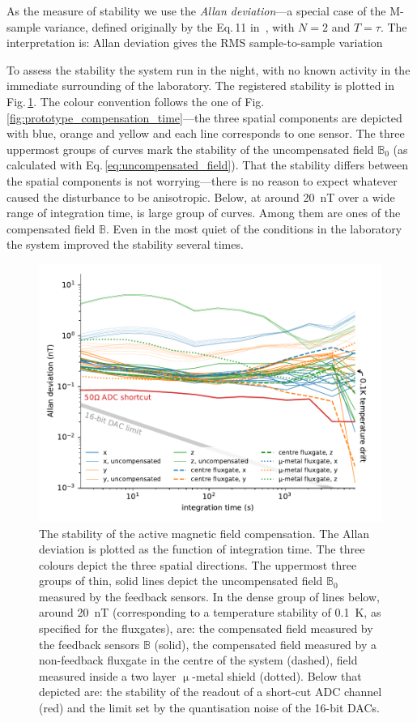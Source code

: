 As the measure of stability we use the \emph{Allan deviation}---a special case of the M-sample variance, defined originally by the Eq.\,11 in~\cite{Allan1966}, with $N=2$ and $T = \tau$. The interpretation is: Allan deviation gives the RMS sample-to-sample variation 

To assess the stability the system run in the night, with no known activity in the immediate surrounding of the laboratory. The registered stability is plotted in Fig.\,\ref{fig:prototype_stability}. The colour convention follows the one of Fig.\,\ref{fig:prototype_compensation_time}---the three spatial components are depicted with blue, orange and yellow and each line corresponds to one sensor. The three uppermost groups of curves mark the stability of the uncompensated field $\mathbb{B}_0$ (as calculated with Eq.\,\ref{eq:uncompensated_field}). That the stability differs between the spatial components is not worrying---there is no reason to expect whatever caused the disturbance to be anisotropic. Below, at around \SI{20}{\nano\tesla} over a wide range of integration time, is large group of curves. Among them are ones of the compensated field $\mathbb{B}$. Even in the most quiet of the conditions in the laboratory the system improved the stability several times.

\begin{figure}
  \centering
  \includegraphics[width=0.9\linewidth]{gfx/prototype/run7_field_stability.pdf}
  \caption{The stability of the active magnetic field compensation. The Allan deviation is plotted as the function of integration time. The three colours depict the three spatial directions. The uppermost three groups of thin, solid lines depict the uncompensated field $\mathbb{B}_0$ measured by the feedback sensors. In the dense group of lines below, around \SI{20}{\nano\tesla} (corresponding to a temperature stability of \SI{0.1}{\kelvin}, as specified for the fluxgates), are: the compensated field measured by the feedback sensors $\mathbb{B}$ (solid), the compensated field measured by a non-feedback fluxgate in the centre of the system (dashed), field measured inside a two layer $\upmu$-metal shield (dotted). Below that depicted are: the stability of the readout of a short-cut ADC channel (red) and the limit set by the quantisation noise of the 16-bit DACs.}
  \label{fig:prototype_stability}
\end{figure}

